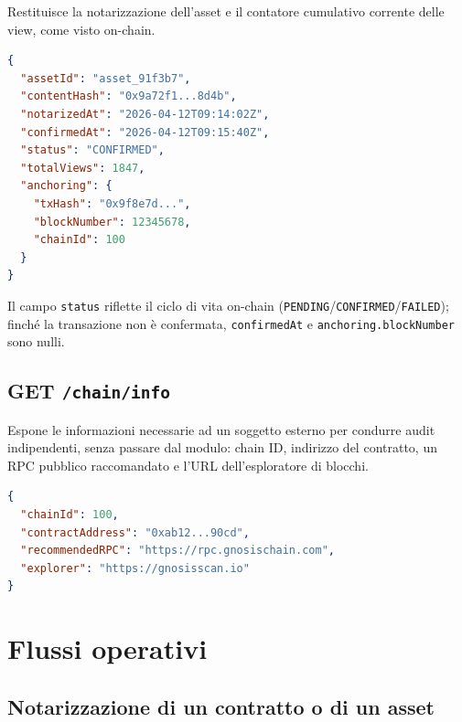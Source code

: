 \documentclass[a4paper,11pt]{article}
\begin{document}
Restituisce la notarizzazione dell'asset e il contatore cumulativo corrente delle view, come visto on-chain.

\begin{lstlisting}[language=json, caption={Esempio di risposta a \texttt{GET /assets/\{id\}}.}]
{
  "assetId": "asset_91f3b7",
  "contentHash": "0x9a72f1...8d4b",
  "notarizedAt": "2026-04-12T09:14:02Z",
  "confirmedAt": "2026-04-12T09:15:40Z",
  "status": "CONFIRMED",
  "totalViews": 1847,
  "anchoring": {
    "txHash": "0x9f8e7d...",
    "blockNumber": 12345678,
    "chainId": 100
  }
}
\end{lstlisting}

\noindent Il campo \texttt{status} riflette il ciclo di vita on-chain (\texttt{PENDING}/\texttt{CONFIRMED}/\texttt{FAILED}); finch\'e la transazione non \`e confermata, \texttt{confirmedAt} e \texttt{anchoring.blockNumber} sono nulli.

\subsection{GET \texttt{/chain/info}}

Espone le informazioni necessarie ad un soggetto esterno per condurre audit indipendenti, senza passare dal modulo: chain ID, indirizzo del contratto, un RPC pubblico raccomandato e l'URL dell'esploratore di blocchi.

\begin{lstlisting}[language=json, caption={Esempio di risposta a \texttt{GET /chain/info}.}]
{
  "chainId": 100,
  "contractAddress": "0xab12...90cd",
  "recommendedRPC": "https://rpc.gnosischain.com",
  "explorer": "https://gnosisscan.io"
}
\end{lstlisting}

\section{Flussi operativi}\label{sec:flussi}

\subsection{Notarizzazione di un contratto o di un asset}
\end{document}
